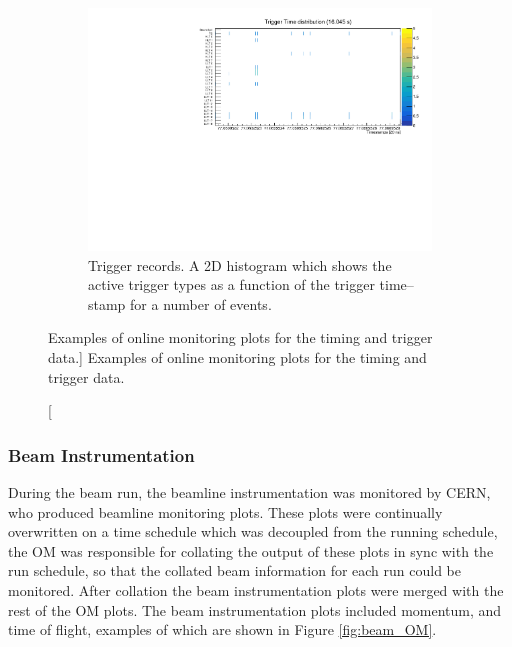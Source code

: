 \begin{figure}
	\begin{subfigure}[b]{0.8\textwidth}
		\centering
		\vspace{3mm}
		\includegraphics[width=\textwidth]{figures/trigger_record.pdf}
		\caption {Trigger records. A 2D histogram which shows the active trigger
		types as a function of the trigger time--stamp for a number of events.}
		\label{fig:trig_record}
	\end{subfigure}

	\caption
	[Examples of online monitoring plots for the timing and trigger data.]
	{Examples of online monitoring plots for the timing and trigger data.}
	\label{fig:timing_OM}

\end{figure}

\subsubsection*{Beam Instrumentation}
During the \protodune{} beam run, the beamline instrumentation was monitored 
by CERN, who produced beamline monitoring plots\cite{Booth:2019brj}. These plots
were continually overwritten on a time schedule which was decoupled from the 
\protodune{} running schedule, the OM was responsible for collating the output 
of these plots in sync with the \protodune{} run schedule, so that the 
collated beam information for each run could be monitored. After collation the 
beam instrumentation plots were merged with the rest of the OM plots. The beam 
instrumentation plots included momentum, and time of flight, examples of which 
are shown in Figure \ref{fig:beam_OM}.

